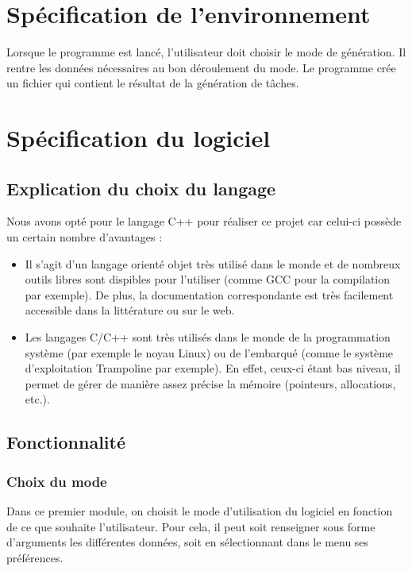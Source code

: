 
\chapter{Spécification de l’environnement}
Lorsque le programme est lancé, l’utilisateur doit choisir le mode de génération. Il rentre les données nécessaires au bon déroulement du mode. Le programme crée un fichier qui contient le résultat de la génération de tâches.


\chapter{Spécification du logiciel}

\section{Explication du choix du langage}
Nous avons opté pour le langage C++ pour réaliser ce projet car celui-ci possède un certain nombre d'avantages :
\begin{itemize}
\item Il s'agit d'un langage orienté objet très utilisé dans le monde et de nombreux outils libres sont dispibles pour l'utiliser (comme GCC pour la compilation par exemple). De plus, la documentation correspondante est très facilement accessible dans la littérature ou sur le web.
\item Les langages C/C++ sont très utilisés dans le monde de la programmation système (par exemple le noyau Linux) ou de l'embarqué (comme le système d'exploitation Trampoline par exemple). En effet, ceux-ci étant bas niveau, il permet de gérer de manière assez précise la mémoire (pointeurs, allocations, etc.).
\end{itemize}

\section{Fonctionnalité}
        
\subsection{Choix du mode}
Dans ce premier module, on choisit le mode d’utilisation du logiciel en fonction de ce que souhaite l’utilisateur. Pour cela, il peut soit renseigner sous forme d’arguments les différentes données, soit en sélectionnant dans le menu ses préférences. \\

